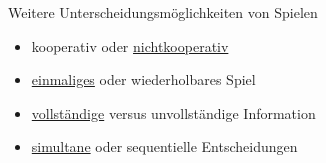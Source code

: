 Weitere Unterscheidungsmöglichkeiten von Spielen
\begin{itemize}
	\item kooperativ oder \underline{nichtkooperativ} 
	\item \underline{einmaliges} oder wiederholbares Spiel
	\item \underline{vollständige} versus unvollständige Information
	\item \underline{simultane} oder sequentielle Entscheidungen
\end{itemize}





